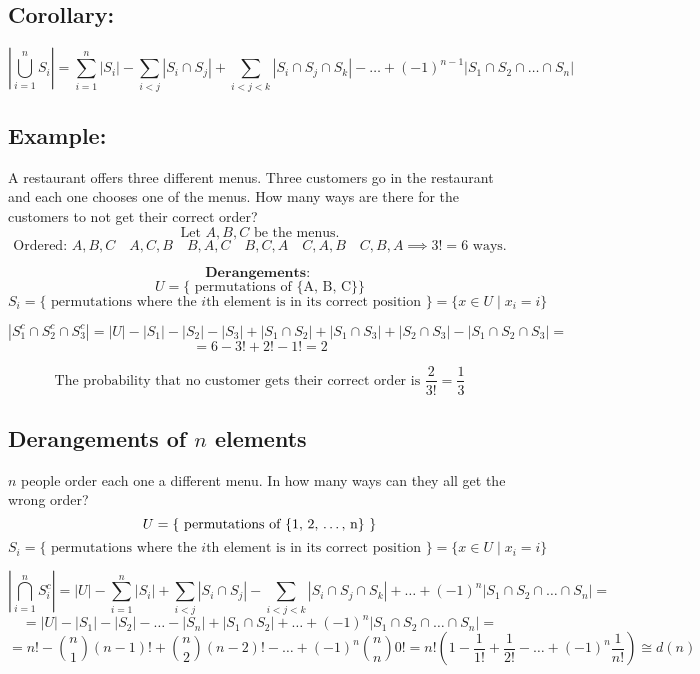\documentclass[11pt]{article}
\begin{document}
\subsection*{Corollary:}
\[
\left| \bigcup_{i=1}^{n} S_i \right| = \sum_{i=1}^{n} \left| S_i \right| - \sum_{i < j} \left| S_i \cap S_j \right| + \sum_{i < j < k} \left| S_i \cap S_j \cap S_k \right| - \dots + (-1)^{n-1} \left| S_1 \cap S_2 \cap \dots \cap S_n \right|
\]

\subsection*{Example:}
A restaurant offers three different menus. Three customers go in the restaurant and each one chooses one of the menus. How many ways are there for the customers to not get their correct order?
\[
\text{Let } A, B, C \text{ be the menus.}
\]
\[
\text{Ordered: } A, B, C \quad A, C, B \quad B, A, C \quad B, C, A \quad C, A, B \quad C, B, A \implies 3! = 6 \text{ ways.}
\]

\[
\textbf{Derangements: }
\]
\[
U = \{\text{ permutations of \{A, B, C\} }\}
\]
\[
S_i = \{\text{ permutations where the $i$th element is in its correct position }\} = \{x \in U \mid x_i = i\}
\]

\[
\left| S_1^c \cap S_2^c \cap S_3^c \right| = \left| U \right| - \left| S_1 \right| - \left| S_2 \right| - \left| S_3 \right| + \left| S_1 \cap S_2 \right| + \left| S_1 \cap S_3 \right| + \left| S_2 \cap S_3 \right| - \left| S_1 \cap S_2 \cap S_3 \right| = 
\]
\[
= 6 - 3! + 2! - 1! = 2
\]

\[
\text{The probability that no customer gets their correct order is } \frac{2}{3!} = \frac{1}{3}
\]

\subsection{Derangements of $n$ elements}
$n$ people order each one a different menu. In how many ways can they all get the wrong order?
\[
U = \{\text{ permutations of \{1, 2, \dots, n\} }\}
\]
\[
S_i = \{\text{ permutations where the $i$th element is in its correct position }\} = \{x \in U \mid x_i = i\}
\]

\[
\left| \bigcap_{i=1}^{n} S_i^c \right| = \left| U \right| - \sum_{i=1}^{n} \left| S_i \right| + \sum_{i < j} \left| S_i \cap S_j \right| - \sum_{i < j < k} \left| S_i \cap S_j \cap S_k \right| + \dots + (-1)^n \left| S_1 \cap S_2 \cap \dots \cap S_n \right| =
\]
\[
= \left| U \right| - \left| S_1 \right| - \left| S_2 \right| - \dots - \left| S_n \right| + \left| S_1 \cap S_2 \right| + \dots + (-1)^n \left| S_1 \cap S_2 \cap \dots \cap S_n \right| =
\]
\[
= n! - \binom{n}{1} (n - 1)! + \binom{n}{2} (n - 2)! - \dots + (-1)^n \binom{n}{n} 0! = n! \left(1 - \frac{1}{1!} + \frac{1}{2!} - \dots + (-1)^n \frac{1}{n!} \right) \cong d(n)
\]
\end{document}
